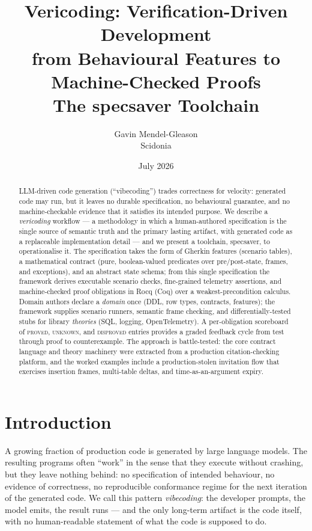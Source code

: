 \documentclass[11pt,a4paper]{article}
\title{\textbf{Vericoding: Verification-Driven Development\\
from Behavioural Features to Machine-Checked Proofs}\\[4pt]
\large The \textsf{specsaver} Toolchain}
\author{Gavin Mendel-Gleason\\Scidonia}
\date{July 2026}
\begin{document}
\maketitle

\begin{abstract}
LLM-driven code generation (``vibecoding'') trades correctness for
velocity: generated code may run, but it leaves no durable
specification, no behavioural guarantee, and no machine-checkable
evidence that it satisfies its intended purpose.  We describe a
\emph{vericoding} workflow --- a methodology in which a human-authored
specification is the single source of semantic truth and the primary
lasting artifact, with generated code as a replaceable implementation
detail --- and we present a toolchain, \textsf{specsaver}, to
operationalise it.  The specification takes the form of Gherkin
features (scenario tables), a mathematical contract (pure,
boolean-valued predicates over pre/post-state, frames, and
exceptions), and an abstract state schema; from this single
specification the framework derives executable scenario checks,
fine-grained telemetry assertions, and machine-checked proof
obligations in Rocq (Coq) over a weakest-precondition calculus.
Domain authors declare a \emph{domain} once (DDL, row types, contracts,
features); the framework supplies scenario runners, semantic frame
checking, and differentially-tested stubs for library \emph{theories}
(SQL, logging, OpenTelemetry).  A per-obligation scoreboard of
\textsc{proved}, \textsc{unknown}, and \textsc{disproved} entries
provides a graded feedback cycle from test through proof to
counterexample.  The approach is battle-tested: the core contract
language and theory machinery were extracted from a production
citation-checking platform, and the worked examples include a
production-stolen invitation flow that exercises insertion frames,
multi-table deltas, and time-as-an-argument expiry.
\end{abstract}

\section{Introduction}\label{sec:intro}

A growing fraction of production code is generated by large language
models.  The resulting programs often ``work'' in the sense that they
execute without crashing, but they leave nothing behind: no
specification of intended behaviour, no evidence of correctness, no
reproducible conformance regime for the next iteration of the
generated code.  We call this pattern \emph{vibecoding}: the developer
prompts, the model emits, the result runs --- and the only long-term
artifact is the code itself, with no human-readable statement of what
the code is supposed to do.
\end{document}

